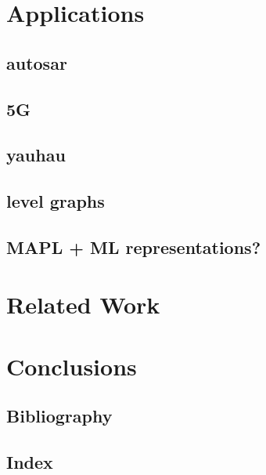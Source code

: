 \documentclass{report}
\begin{document}
\chapter{Applications}

\section{autosar}

\section{5G}

\section{yauhau}

\section{level graphs}

\section{MAPL + ML representations?}


\chapter{Related Work}


\chapter{Conclusions} 


\section*{Bibliography} 
\section*{Index} 
\end{document}
